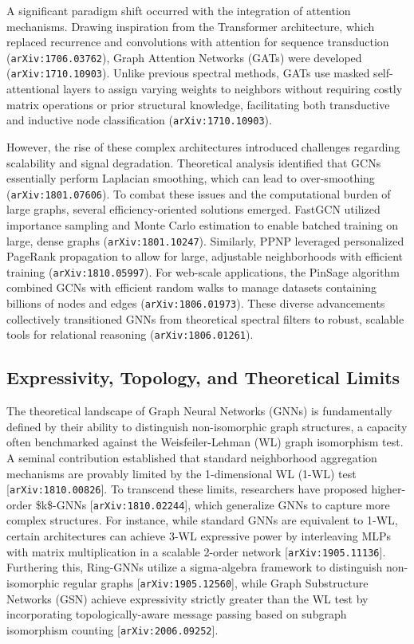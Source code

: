 \documentclass[11pt]{article}
\begin{document}
A significant paradigm shift occurred with the integration of attention mechanisms. Drawing inspiration from the Transformer architecture, which replaced recurrence and convolutions with attention for sequence transduction (\texttt{arXiv:1706.03762}), Graph Attention Networks (GATs) were developed (\texttt{arXiv:1710.10903}). Unlike previous spectral methods, GATs use masked self-attentional layers to assign varying weights to neighbors without requiring costly matrix operations or prior structural knowledge, facilitating both transductive and inductive node classification (\texttt{arXiv:1710.10903}).

However, the rise of these complex architectures introduced challenges regarding scalability and signal degradation. Theoretical analysis identified that GCNs essentially perform Laplacian smoothing, which can lead to over-smoothing (\texttt{arXiv:1801.07606}). To combat these issues and the computational burden of large graphs, several efficiency-oriented solutions emerged. FastGCN utilized importance sampling and Monte Carlo estimation to enable batched training on large, dense graphs (\texttt{arXiv:1801.10247}). Similarly, PPNP leveraged personalized PageRank propagation to allow for large, adjustable neighborhoods with efficient training (\texttt{arXiv:1810.05997}). For web-scale applications, the PinSage algorithm combined GCNs with efficient random walks to manage datasets containing billions of nodes and edges (\texttt{arXiv:1806.01973}). These diverse advancements collectively transitioned GNNs from theoretical spectral filters to robust, scalable tools for relational reasoning (\texttt{arXiv:1806.01261}).

\subsection{Expressivity, Topology, and Theoretical Limits}

The theoretical landscape of Graph Neural Networks (GNNs) is fundamentally defined by their ability to distinguish non-isomorphic graph structures, a capacity often benchmarked against the Weisfeiler-Lehman (WL) graph isomorphism test. A seminal contribution established that standard neighborhood aggregation mechanisms are provably limited by the 1-dimensional WL (1-WL) test [\texttt{arXiv:1810.00826}]. To transcend these limits, researchers have proposed higher-order \$k\$-GNNs [\texttt{arXiv:1810.02244}], which generalize GNNs to capture more complex structures. For instance, while standard GNNs are equivalent to 1-WL, certain architectures can achieve 3-WL expressive power by interleaving MLPs with matrix multiplication in a scalable 2-order network [\texttt{arXiv:1905.11136}]. Furthering this, Ring-GNNs utilize a sigma-algebra framework to distinguish non-isomorphic regular graphs [\texttt{arXiv:1905.12560}], while Graph Substructure Networks (GSN) achieve expressivity strictly greater than the WL test by incorporating topologically-aware message passing based on subgraph isomorphism counting [\texttt{arXiv:2006.09252}].
\end{document}
